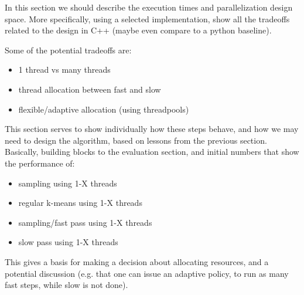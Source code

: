 In this section we should describe the execution times and parallelization design space.
More specifically, using a selected implementation, show all the tradeoffs related to the design in C++ (maybe even compare to a python baseline).

Some of the potential tradeoffs are:
\begin{itemize}
    \item 1 thread vs many threads
    \item thread allocation between fast and slow
    \item flexible/adaptive allocation (using threadpools)
\end{itemize}

This section serves to show individually how these steps behave, and how we may need to design the algorithm, based on lessons from the previous section. Basically, building blocks to the evaluation section, and initial numbers that show the performance of:

\begin{itemize}
    \item sampling using 1-X threads
    \item regular k-means using 1-X threads
    \item sampling/fast pass using 1-X threads
    \item slow pass using 1-X threads
\end{itemize}

This gives a basis for making a decision about allocating resources, and a potential discussion (e.g. that one can issue an adaptive policy, to run as many fast steps, while slow is not done).

